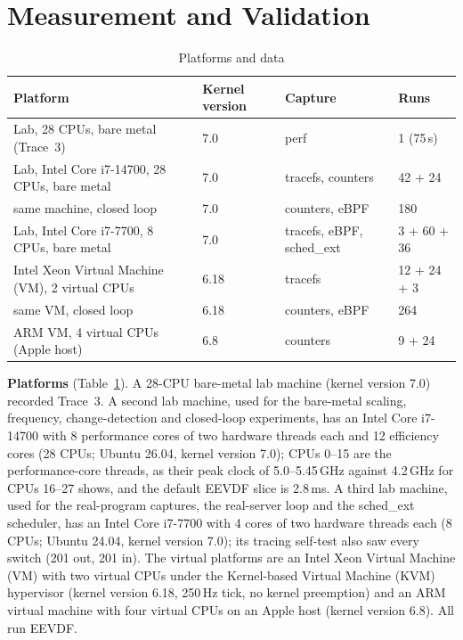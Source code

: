 \documentclass[conference,onecolumn,11pt]{IEEEtran}
\begin{document}
\section{Measurement and Validation}\label{sec:measure}
\begin{table}[t]
\centering
\caption{Platforms and data}\label{tab:platforms}
\begin{tabular}{@{}llll@{}}
\toprule
Platform & Kernel version & Capture & Runs \\
\midrule
Lab, 28 CPUs, bare metal (Trace~3) & 7.0 & perf & 1 (75\,s) \\
Lab, Intel Core i7-14700, 28 CPUs, bare metal & 7.0 & tracefs, counters & 42 + 24 \\
\quad same machine, closed loop & 7.0 & counters, eBPF & 180 \\
Lab, Intel Core i7-7700, 8 CPUs, bare metal & 7.0 & tracefs, eBPF, sched\_ext & 3 + 60 + 36 \\
Intel Xeon Virtual Machine (VM), 2 virtual CPUs & 6.18 & tracefs & 12 + 24 + 3 \\
\quad same VM, closed loop & 6.18 & counters, eBPF & 264 \\
ARM VM, 4 virtual CPUs (Apple host) & 6.8 & counters & 9 + 24 \\
\bottomrule
\end{tabular}
\end{table}

\textbf{Platforms} (Table~\ref{tab:platforms}). A 28-CPU bare-metal lab machine (kernel version 7.0) recorded Trace~3. A second lab machine, used for the bare-metal scaling, frequency, change-detection and closed-loop experiments, has an Intel Core i7-14700 with 8 performance cores of two hardware threads each and 12 efficiency cores (28 CPUs; Ubuntu 26.04, kernel version 7.0); CPUs 0--15 are the performance-core threads, as their peak clock of 5.0--5.45\,GHz against 4.2\,GHz for CPUs 16--27 shows, and the default EEVDF slice is 2.8\,ms. A third lab machine, used for the real-program captures, the real-server loop and the sched\_ext scheduler, has an Intel Core i7-7700 with 4 cores of two hardware threads each (8 CPUs; Ubuntu 24.04, kernel version 7.0); its tracing self-test also saw every switch (201 out, 201 in). The virtual platforms are an Intel Xeon Virtual Machine (VM) with two virtual CPUs under the Kernel-based Virtual Machine (KVM) hypervisor (kernel version 6.18, 250\,Hz tick, no kernel preemption) and an ARM virtual machine with four virtual CPUs on an Apple host (kernel version 6.8). All run EEVDF.
\end{document}
